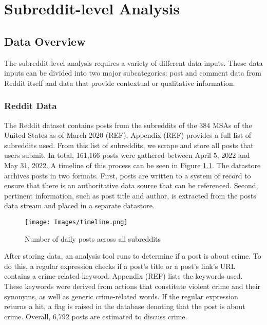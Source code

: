 \documentclass[12pt,oneside, letterpaper]{book}
\begin{document}
\chapter{Subreddit-level Analysis}

\section{Data Overview}
\par The subreddit-level analysis requires a variety of different data inputs. These data inputs can be divided into two major subcategories: post and comment data from Reddit itself and data that provide contextual or qualitative information.

\subsection{Reddit Data}
\par The Reddit dataset contains posts from the subreddits of the 384 MSAs of the United States as of March 2020 (REF). Appendix (REF) provides a full list of subreddits used. From this list of subreddits, we scrape and store all posts that users submit. In total, 161,166 posts were gathered between April 5, 2022 and May 31, 2022. A timeline of this process can be seen in Figure \ref{fig:line-1}. The datastore archives posts in two formats. First, posts are written to a system of record to ensure that there is an authoritative data source that can be referenced. Second, pertinent information, such as post title and author, is extracted from the posts data stream and placed in a separate datastore.

\begin{figure}[ht]
    \texttt{[image: Images/timeline.png]}
    \caption{Number of daily posts across all subreddits}
    \label{fig:line-1}
\end{figure}

\par After storing data, an analysis tool runs to determine if a post is about crime. To do this, a regular expression checks if a post's title or a post's link's URL contains a crime-related keyword. Appendix (REF) lists the keywords used. These keywords were derived from actions that constitute violent crime and their synonyms, as well as generic crime-related words. If the regular expression returns a hit, a flag is raised in the database denoting that the post is about crime. Overall, 6,792 posts are estimated to discuss crime.
\end{document}

